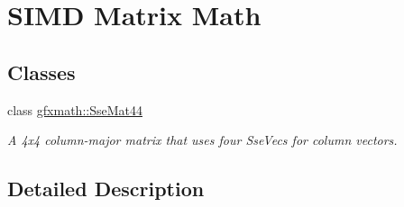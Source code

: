 \hypertarget{group___s_i_m_d_mat_math}{}\section{S\+I\+M\+D Matrix Math}
\label{group___s_i_m_d_mat_math}
\subsection*{Classes}
\begin{DoxyCompactItemize}
\item 
class \hyperlink{classgfxmath_1_1_sse_mat44}{gfxmath\+::\+Sse\+Mat44}
\begin{DoxyCompactList}\small\item\em A 4x4 column-\/major matrix that uses four Sse\+Vecs for column vectors. \end{DoxyCompactList}\end{DoxyCompactItemize}


\subsection{Detailed Description}
